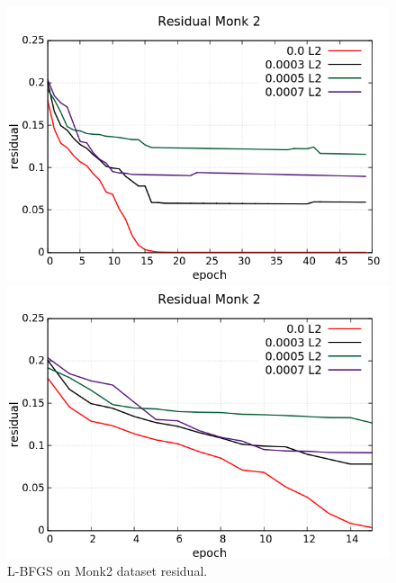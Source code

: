 \begin{figure}[H]
	\centering
	\begin{minipage}[t]{0.5\linewidth}
		\includegraphics[width=\linewidth]{data/LBFGS/Monk2/Monk2_LBFGS_Residual_standard.png}
	\end{minipage}%
	\begin{minipage}[t]{0.5\linewidth}
		\includegraphics[width=\linewidth]{data/LBFGS/Monk2/Monk2_LBFGS_Residual_zoom.png}
	\end{minipage}
	\caption{L-BFGS on Monk2 dataset residual.}
\end{figure}
